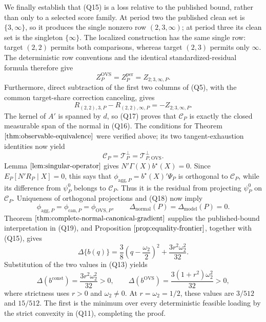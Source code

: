 We finally establish that (Q15) is a loss relative to the published bound, rather than only to a selected score family.  At period two the published clean set is \(\{3,\infty\}\), so it produces the single nonzero row \((2,3,\infty)\); at period three its clean set is the singleton \(\{\infty\}\).  The localized construction has the same single row: target \((2,2)\) permits both comparisons, whereas target \((2,3)\) permits only \(\infty\).  The deterministic row conventions and the identical standardized-residual formula therefore give
\[
 Z_P^{\mathrm{OVS}}=Z_P^{\mathrm{per}}=Z_{2;3,\infty,P}.
\tag{Q16}
\]
Furthermore, direct subtraction of the first two columns of (Q5), with the common target-share correction canceling, gives
\[
 R_{(2,2),3,P}-R_{(2,2),\infty,P}=-Z_{2;3,\infty,P}.
\tag{Q17}
\]
The kernel of \(A'\) is spanned by \(d\), so (Q17) proves that \(\mathcal C_P\) is exactly the closed measurable span of the normal in (Q16).  The conditions for Theorem \(\ref{thm:observable-equivalence}\) were verified above; its two tangent-exhaustion identities now yield
\[
 \mathcal C_P=\mathcal T_P^\perp=\mathcal T_{P,\mathrm{OVS}}^\perp.
\tag{Q18}
\]
Lemma \(\ref{lem:singular-operator}\) gives \(N'\Gamma(X)b^\star(X)=0\).  Since \(E_P[N'R_P\mid X]=0\), this says that \(\phi_{\mathrm{agg},P}=b^\star(X)'\Psi_P\) is orthogonal to \(\mathcal C_P\), while its difference from \(\psi_P^0\) belongs to \(\mathcal C_P\).  Thus it is the residual from projecting \(\psi_P^0\) on \(\mathcal C_P\).  Uniqueness of orthogonal projections and (Q18) now imply
\[
 \phi_{\mathrm{agg},P}=\phi_{\mathrm{can},P}=\phi_{\mathrm{OVS},P},
 \qquad
 \Delta_{\mathrm{normal}}(P)=\Delta_{\mathrm{model}}(P)=0.
\tag{Q19}
\]
Theorem \(\ref{thm:complete-normal-canonical-gradient}\) supplies the published-bound interpretation in (Q19), and Proposition \(\ref{prop:equality-frontier}\), together with (Q15), gives
\[
 \Delta\{b(q)\}
 =\frac38\left(q-\frac{\omega_2}{2}\right)^2
 +\frac{3r^2\omega_2^2}{32}.
\tag{Q20}
\]
Substitution of the two values in (Q13) yields
\[
 \Delta(b^{\mathrm{const}})=\frac{3r^2\omega_2^2}{32}>0,
 \qquad
 \Delta(b^{\mathrm{OVS}})=\frac{3(1+r^2)\omega_2^2}{32}>0,
\tag{Q21}
\]
where strictness uses \(r>0\) and \(\omega_2\ne0\).  At \(r=\omega_2=1/2\), these values are \(3/512\) and \(15/512\).  The first is the minimum over every deterministic feasible loading by the strict convexity in (Q11), completing the proof.

